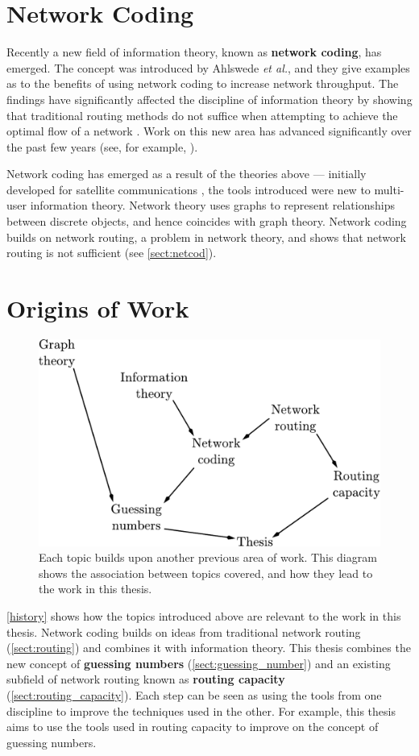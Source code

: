 \section{Network Coding}

Recently a new field of information theory, known as \textbf{network coding}, has emerged. The concept was introduced by Ahlswede \textit{et al.}, and they give examples as to the benefits of using network coding to increase network throughput. The findings have significantly affected the discipline of information theory by showing that traditional routing methods do not suffice when attempting to achieve the optimal flow of a network \cite{ahls2000}. Work on this new area has advanced significantly over the past few years (see, for example, \cite{ahls2000, hoka2003, koet2003, riis2004, doug2005}).

Network coding has emerged as a result of the theories above --- initially developed for satellite communications \cite{yeun1999}, the tools introduced were new to multi-user information theory. Network theory uses graphs to represent relationships between discrete objects, and hence coincides with graph theory. Network coding builds on network routing, a problem in network theory, and shows that network routing is not sufficient (see \autoref{sect:netcod}).

\section{Origins of Work}

\begin{figure}[ht]
	\centering
	\includegraphics[width=.6\textwidth]{figures/history.pdf}
	\caption[History of the field and topic association]{Each topic builds upon another previous area of work. This diagram shows the association between topics covered, and how they lead to the work in this thesis.}
	\label{history}
\end{figure}

\autoref{history} shows how the topics introduced above are relevant to the work in this thesis. Network coding builds on ideas from traditional network routing (\autoref{sect:routing}) and combines it with information theory. This thesis combines the new concept of \textbf{guessing numbers} \cite{riis2005util, riis2005info} (\autoref{sect:guessing_number}) and an existing subfield of network routing known as \textbf{routing capacity} (\autoref{sect:routing_capacity}). Each step can be seen as using the tools from one discipline to improve the techniques used in the other. For example, this thesis aims to use the tools used in routing capacity to improve on the concept of guessing numbers.

